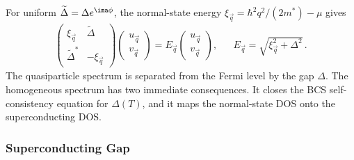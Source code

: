             For uniform $\widetilde{\Delta}=\Delta e^{\ima\phi}$, the normal-state energy $\xi_{\vec q}=\hbar^2q^2/(2m^\ast)-\mu$ gives
            \begin{align}
                \begin{pmatrix}
                    \xi_{\vec q} & \widetilde{\Delta}\\
                    \widetilde{\Delta}^{\ast} & -\xi_{\vec q}
                \end{pmatrix}
                \begin{pmatrix}u_{\vec q}\\v_{\vec q}\end{pmatrix}
                =E_{\vec q}
                \begin{pmatrix}u_{\vec q}\\v_{\vec q}\end{pmatrix},
                &&
                E_{\vec q}=\sqrt{\xi_{\vec q}^2+\Delta^2}\,.
                \label{eq:micro:bdg-homogeneous}
            \end{align}
            The quasiparticle spectrum is separated from the Fermi level by the gap $\Delta$. The homogeneous spectrum has two immediate consequences. It closes the BCS self-consistency equation for $\Delta(T)$, and it maps the normal-state DOS onto the superconducting DOS.

        \subsubsection*{Superconducting Gap}
        \label{subsubsec:micro:superconducting-gap}

